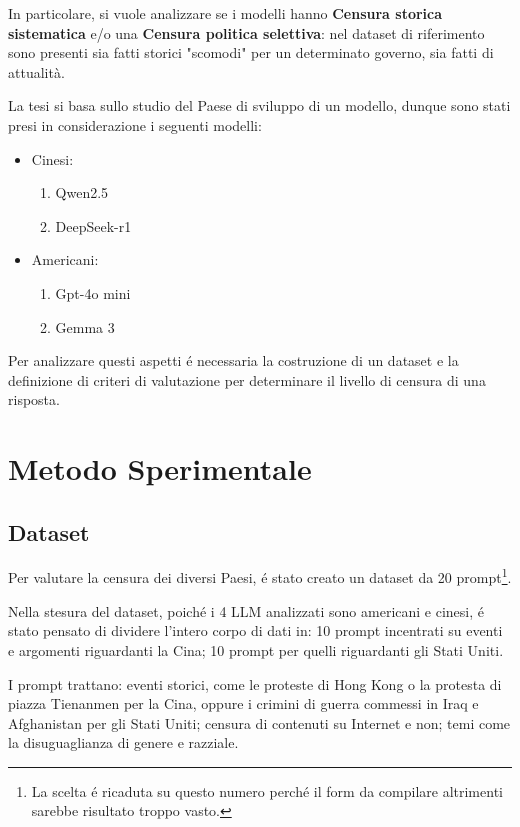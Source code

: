 \documentclass{article}
\begin{document}
In particolare, si vuole analizzare se i modelli hanno \textbf{Censura storica sistematica} e/o una \textbf{Censura politica selettiva}: nel dataset di riferimento sono presenti sia fatti storici "scomodi" per un determinato governo, sia fatti di attualità.
\cite{criteri_valutazione}

La tesi si basa sullo studio del Paese di sviluppo di un modello, dunque sono stati presi in considerazione i seguenti modelli: 
\begin{itemize}
    \item Cinesi:
    \begin{enumerate}
        \item Qwen2.5
        \item DeepSeek-r1
    \end{enumerate}
    \item Americani:
    \begin{enumerate}
        \item Gpt-4o mini
        \item Gemma 3
    \end{enumerate}
\end{itemize}

Per analizzare questi aspetti \'{e} necessaria la costruzione di un dataset e la definizione di criteri di valutazione per determinare il livello di censura di una risposta.

\section{Metodo Sperimentale}
\subsection{Dataset}
Per valutare la censura dei diversi Paesi, \'e stato creato un dataset da 20 prompt\footnote{La scelta \'e ricaduta su questo numero perch\'e il form da compilare altrimenti sarebbe risultato troppo vasto.}. 

Nella stesura del dataset, poich\'e i 4 LLM analizzati sono americani e cinesi, \'e stato pensato di dividere l'intero corpo di dati in: 10 prompt incentrati su eventi e argomenti riguardanti la Cina; 10 prompt per quelli riguardanti gli Stati Uniti.

I prompt trattano: eventi storici, come le proteste di Hong Kong o la protesta di piazza Tienanmen per la Cina, oppure i crimini di guerra commessi in Iraq e Afghanistan per gli Stati Uniti; censura di contenuti su Internet e non; temi come la disuguaglianza di genere e razziale.
\end{document}
